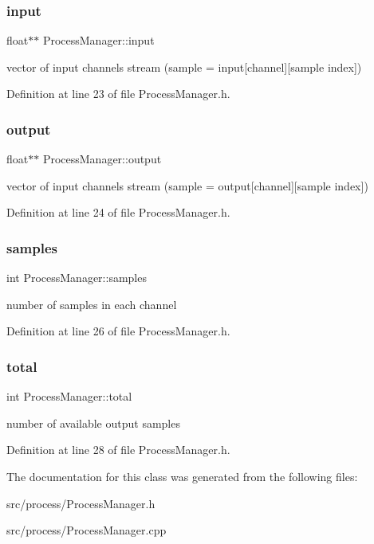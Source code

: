 \subsubsection{\texorpdfstring{input}{input}}
{\footnotesize\ttfamily float$\ast$$\ast$ Process\+Manager\+::input}

vector of input channels stream (sample = input\mbox{[}channel\mbox{]}\mbox{[}sample index\mbox{]}) 

Definition at line 23 of file Process\+Manager.\+h.

\mbox{\label{class_process_manager_a135c866f06b0042c2835cd9ecefa05f3}} 
\subsubsection{\texorpdfstring{output}{output}}
{\footnotesize\ttfamily float$\ast$$\ast$ Process\+Manager\+::output}

vector of input channels stream (sample = output\mbox{[}channel\mbox{]}\mbox{[}sample index\mbox{]}) 

Definition at line 24 of file Process\+Manager.\+h.

\mbox{\label{class_process_manager_aac9c5dea3ac0ed72df1f6f780c62010a}} 
\subsubsection{\texorpdfstring{samples}{samples}}
{\footnotesize\ttfamily int Process\+Manager\+::samples}

number of samples in each channel 

Definition at line 26 of file Process\+Manager.\+h.

\mbox{\label{class_process_manager_abcf97b9835a8dfb0d55e37069663cda9}} 
\subsubsection{\texorpdfstring{total}{total}}
{\footnotesize\ttfamily int Process\+Manager\+::total}

number of available output samples 

Definition at line 28 of file Process\+Manager.\+h.



The documentation for this class was generated from the following files\+:\begin{DoxyCompactItemize}
\item 
src/process/Process\+Manager.\+h\item 
src/process/Process\+Manager.\+cpp\end{DoxyCompactItemize}
